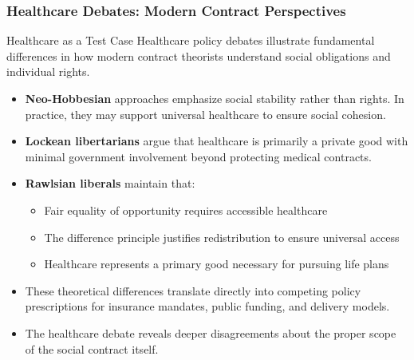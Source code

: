 \documentclass[aspectratio=169]{beamer}
\begin{document}
\begin{frame}
  \frametitle{Healthcare Debates: Modern Contract Perspectives}
  
  \begin{block}{Healthcare as a Test Case}
    Healthcare policy debates illustrate fundamental differences in how modern contract theorists understand social obligations and individual rights.
  \end{block}
  
  \begin{itemize}
    \item \textbf{Neo-Hobbesian} approaches emphasize social stability rather than rights. In practice, they may support universal healthcare to ensure social cohesion.
    \item \textbf{Lockean libertarians} argue that healthcare is primarily a private good with minimal government involvement beyond protecting medical contracts.
    \item \textbf{Rawlsian liberals} maintain that:
      \begin{itemize}
        \item Fair equality of opportunity requires accessible healthcare
        \item The difference principle justifies redistribution to ensure universal access
        \item Healthcare represents a primary good necessary for pursuing life plans
      \end{itemize}
    \item These theoretical differences translate directly into competing policy prescriptions for insurance mandates, public funding, and delivery models.
    \item The healthcare debate reveals deeper disagreements about the proper scope of the social contract itself.
  \end{itemize}
\end{frame}
\end{document}
